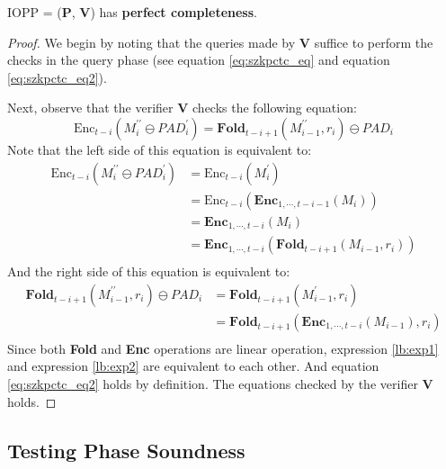 \begin{lemma}
\label{lemma:szkpctcc}

IOPP = ($\textbf{P}$, $\textbf{V}$) has \textbf{perfect completeness}.

\end{lemma}
\begin{proof}
We begin by noting that the queries made by $\textbf{V}$ suffice to perform the checks in the query phase (see equation \ref{eq:szkpctc_eq} and equation \ref{eq:szkpctc_eq2}).

Next, observe that the verifier $\textbf{V}$ checks the following equation:
$$
    \text{Enc}_{t-i}(M_i^{\prime\prime} \ominus PAD_{i}^\prime) = \textbf{Fold}_{t-i+1}(M_{i-1}^{\prime\prime}, r_i) \ominus PAD_i 
$$
Note that the left side of this equation is equivalent to:
\begin{align}
\text{Enc}_{t-i}(M_i^{\prime\prime} \ominus PAD_{i}^\prime) &= \text{Enc}_{t-i}(M_i^\prime) \nonumber \\
&= \text{Enc}_{t-i}(\textbf{Enc}_{1, \cdots, t- i - 1}(M_i)) \nonumber \\
&= \textbf{Enc}_{1, \cdots, t-i}(M_i) \nonumber \\
&= \textbf{Enc}_{1, \cdots, t-i}(\textbf{Fold}_{t-i+1}(M_{i-1}, r_i)) \label{lb:exp1} \\
\end{align}
And the right side of this equation is equivalent to:
\begin{align}
\textbf{Fold}_{t-i+1}(M_{i-1}^{\prime\prime}, r_i) \ominus PAD_i &= \textbf{Fold}_{t-i+1}(M_{i-1}^\prime, r_i) \nonumber \\
&= \textbf{Fold}_{t-i+1}(\textbf{Enc}_{1, \cdots, t- i}(M_{i-1}), r_i) \label{lb:exp2} \\
\end{align}
Since both \textbf{Fold} and \textbf{Enc} operations are linear operation, expression \ref{lb:exp1} and  expression \ref{lb:exp2} are equivalent to each other. And equation \ref{eq:szkpctc_eq2} holds by definition.
The equations checked by the verifier $\textbf{V}$ holds.

\end{proof}




\subsection{Testing Phase Soundness}

